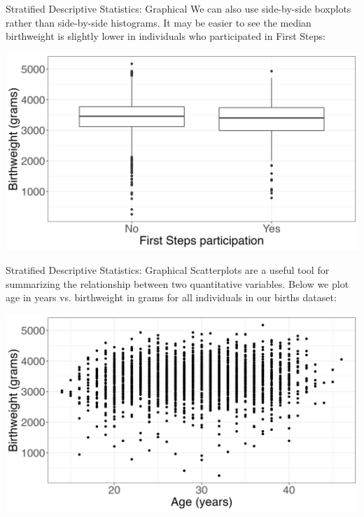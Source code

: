 \documentclass[10pt,t]{beamer}
\begin{document}
\begin{frame}{Stratified Descriptive Statistics: Graphical}
We can also use side-by-side boxplots rather than side-by-side histograms. It may be easier to see the median birthweight is slightly lower in individuals who participated in First Steps:

\vspace{0.3cm}

\centering \includegraphics[scale=0.3]{fs_box_firstep.png}
\end{frame}

\begin{frame}{Stratified Descriptive Statistics: Graphical}
Scatterplots are a useful tool for summarizing the relationship between two quantitative variables. Below we plot age in years vs. birthweight in grams for all individuals in our births dataset:

\vspace{0.3cm}

\centering \includegraphics[scale=0.3]{fs_scatter.png}

\end{frame}
\end{document}
